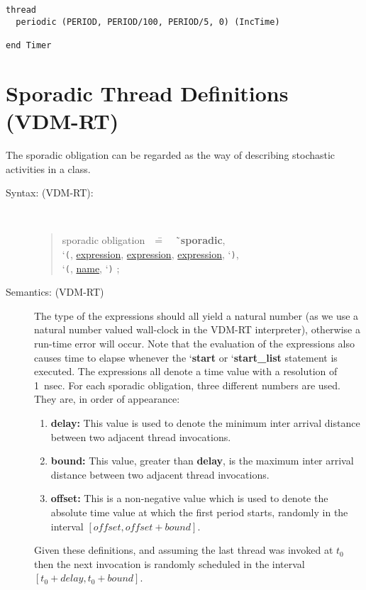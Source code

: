 \documentclass{overturerepchap}
\newcommand{\Lit}[1]{`{\tt #1}\Quote}
\newcommand{\Rule}[2]{
  \begin{quote}\begin{tabbing}
    #1\index{#1}\ \ \= = \ \ \= #2  ; %

  \end{tabbing}\end{quote}
  }
\newcommand{\RuleTarget}[1]{\hypertarget{rule:#1}{}}
\newcommand{\Ruledef}[2]
{
  \RuleTarget{#1}\Rule{#1}{#2}%
  }
\newcommand{\Ruleref}[1]{
  \hyperlink{rule:#1}{#1}}
\newcommand{\lfeed}{\\ \> \>}
\newcommand{\Lop}[1]{`{\bf\ttfamily #1}\Quote}
\begin{document}
{\begin{description}
\begin{lstlisting}
thread
  periodic (PERIOD, PERIOD/100, PERIOD/5, 0) (IncTime)

end Timer
\end{lstlisting}

\end{description}


\section{Sporadic Thread Definitions (VDM-RT)}\label{se:sporadic-thread}

The sporadic obligation can be regarded as the way
of describing stochastic activities in a class.

\begin{description}
\item[Syntax: (VDM-RT):]\mbox{}\\

  \Ruledef{sporadic obligation}{
    \Lop{sporadic}, \lfeed \Lit{(}, \Ruleref{expression},  \Ruleref{expression},   \Ruleref{expression},
    \Lit{)}, \lfeed \Lit{(}, \Ruleref{name}, \Lit{)}
  }

\item[Semantics: (VDM-RT)] The type of the expressions should all yield a natural number (as we use a natural number valued wall-clock in the VDM-RT interpreter), otherwise a run-time error will occur. Note that the evaluation of the expressions also causes time to elapse whenever the \Lop{start} or \Lop{start\_list} statement is executed. The expressions all denote a time value with a resolution of 1~nsec.
For each sporadic obligation, three different numbers are used. They are, in order
of appearance:

\begin{enumerate}
\item \textbf{delay:} This value is used to denote the minimum
inter arrival distance between two adjacent thread invocations.
\item \textbf{bound:} This value, greater than \textbf{delay}, is the maximum inter arrival distance between two adjacent thread invocations.
\item \textbf{offset:} This is a non-negative value which is used to denote the absolute time value at which the first period starts, randomly in the interval $[offset, offset + bound]$.
\end{enumerate}

Given these definitions, and assuming the last thread was invoked at $t_0$ then the next invocation is randomly scheduled in the interval $[t_0 + delay, t_0 + bound]$.


\end{description}}
\end{document}
